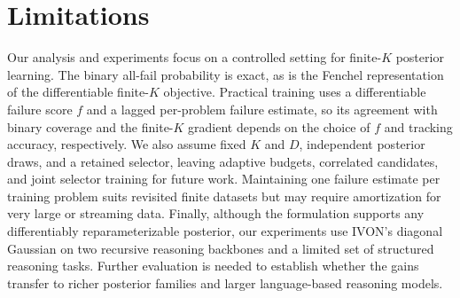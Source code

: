 \section{Limitations}
\label{sec:limitations}

Our analysis and experiments focus on a controlled setting for finite-$K$ posterior learning.
The binary all-fail probability is exact, as is the Fenchel representation of the differentiable finite-$K$ objective.
Practical training uses a differentiable failure score $f$ and a lagged per-problem failure estimate, so its agreement with binary coverage and the finite-$K$ gradient depends on the choice of $f$ and tracking accuracy, respectively.
We also assume fixed $K$ and $D$, independent posterior draws, and a retained selector, leaving adaptive budgets, correlated candidates, and joint selector training for future work.
Maintaining one failure estimate per training problem suits revisited finite datasets but may require amortization for very large or streaming data.
Finally, although the formulation supports any differentiably reparameterizable posterior, our experiments use IVON's diagonal Gaussian on two recursive reasoning backbones and a limited set of structured reasoning tasks.
Further evaluation is needed to establish whether the gains transfer to richer posterior families and larger language-based reasoning models.
